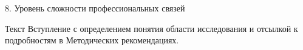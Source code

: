 \begin{frame}{8. Уровень сложности профессиональных связей}

\tiny 
Текст Вступление с определением понятия области исследования и отсылкой к подробностям в Методических рекомендациях.

\end{frame}


